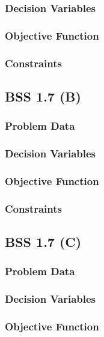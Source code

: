 \documentclass[12pt]{article}
\begin{document}
\subsubsection{Decision Variables}

\subsubsection{Objective Function}

\subsubsection{Constraints}

\subsection{BSS 1.7 (B)}
\subsubsection{Problem Data}

\subsubsection{Decision Variables}

\subsubsection{Objective Function}

\subsubsection{Constraints}

\subsection{BSS 1.7 (C)}
\subsubsection{Problem Data}

\subsubsection{Decision Variables}

\subsubsection{Objective Function}
\end{document}
